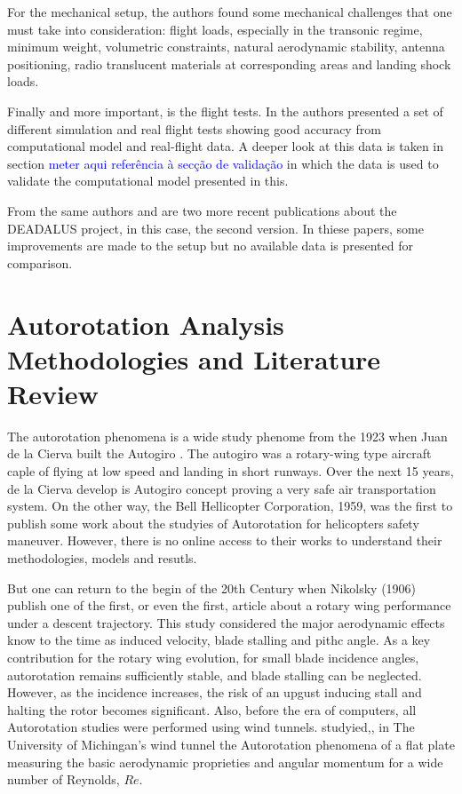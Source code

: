 For the mechanical setup, the authors found some mechanical challenges that one must take into consideration: flight loads, especially in the transonic regime, minimum weight, volumetric constraints, natural aerodynamic stability, antenna positioning, radio translucent materials at corresponding areas and landing shock loads.

Finally and more important, is the flight tests. In \cite{riegler_project_nodate} the authors presented a set of different simulation and real flight tests showing good accuracy from computational model and real-flight data. A deeper look at this data is taken in section \textcolor{blue}{meter aqui referência à secção de validação} in which the data is used to validate the computational model presented in this.

From the same authors \cite{mehringer_suborbital_2022} and \cite{bergmann_daedalus_2024} are two more recent publications about the DEADALUS project, in this case, the second version. In thiese papers, some improvements are made to the setup but no available data is presented for comparison.


\section{Autorotation Analysis Methodologies and Literature Review}
\label{section:literature_review}

The autorotation phenomena is a wide study phenome from the 1923 when Juan de la Cierva built the Autogiro \cite{leishman_principles_2006}. The autogiro was a rotary-wing type aircraft caple of flying at low speed and landing in short runways. Over the next 15 years, de la Cierva develop is Autogiro concept proving a very safe air transportation system. On the other way, the Bell Hellicopter Corporation, 1959, was the first to publish \cite{diaz-silva_rotary_2013} some work about the studyies of Autorotation for helicopters safety maneuver. However, there is no online access to their works to understand their methodologies, models and resutls. 

But one can return to the begin of the  20th Century when Nikolsky (1906) \cite{nikolsky_analytical_1906} publish one of the first, or even the first, article about 
a rotary wing performance under a descent trajectory. This study considered the major aerodynamic effects know to the time as induced velocity, blade stalling and pithc angle. As a key contribution for the rotary wing evolution, for small blade incidence angles, autorotation remains sufficiently stable, and blade stalling can be neglected. However, as the incidence increases, the risk of an upgust inducing stall and halting the rotor becomes significant. Also, before the era of computers, all Autorotation studies were performed using wind tunnels. \cite{smith_autorotating_1971} studyied,, in The University of Michingan's wind tunnel the Autorotation phenomena of a flat plate measuring the basic aerodynamic proprieties and angular momentum for a wide number of Reynolds, $Re$. 


